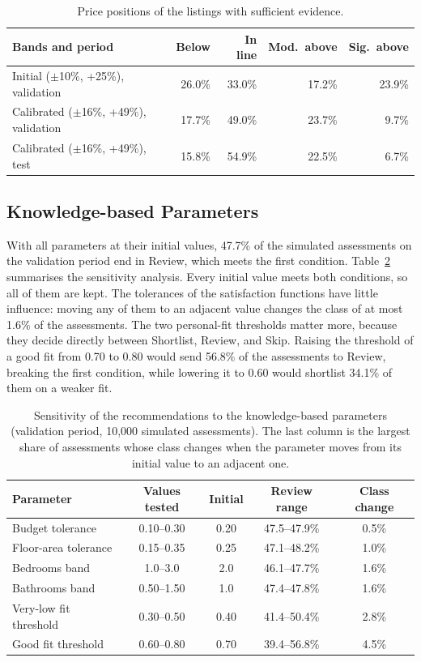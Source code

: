 \documentclass[12pt,a4paper]{report}
\begin{document}
\begin{table}[H]
\centering
\caption{Price positions of the listings with sufficient evidence.}
\label{tab:positions}
\small
\begin{tabularx}{\textwidth}{X r r r r}
\toprule
\textbf{Bands and period} & \textbf{Below} & \textbf{In line} &
\textbf{Mod.\ above} & \textbf{Sig.\ above}\\
\midrule
Initial ($\pm$10\%, +25\%), validation & 26.0\% & 33.0\% & 17.2\% & 23.9\%\\
Calibrated ($\pm$16\%, +49\%), validation & 17.7\% & 49.0\% & 23.7\% & 9.7\%\\
Calibrated ($\pm$16\%, +49\%), test & 15.8\% & 54.9\% & 22.5\% & 6.7\%\\
\bottomrule
\end{tabularx}
\end{table}

\subsection{Knowledge-based Parameters}

With all parameters at their initial values, 47.7\% of the simulated
assessments on the validation period end in Review, which meets the first
condition. Table~\ref{tab:sensitivity} summarises the sensitivity analysis.
Every initial value meets both conditions, so all of them are kept. The
tolerances of the satisfaction functions have little influence: moving any
of them to an adjacent value changes the class of at most 1.6\% of the
assessments. The two personal-fit thresholds matter more, because they
decide directly between Shortlist, Review, and Skip. Raising the threshold
of a good fit from 0.70 to 0.80 would send 56.8\% of the assessments to
Review, breaking the first condition, while lowering it to 0.60 would
shortlist 34.1\% of them on a weaker fit.

\begin{table}[H]
\centering
\caption{Sensitivity of the recommendations to the knowledge-based
parameters (validation period, 10,000 simulated assessments). The last
column is the largest share of assessments whose class changes when the
parameter moves from its initial value to an adjacent one.}
\label{tab:sensitivity}
\small
\begin{tabularx}{\textwidth}{X c c c c}
\toprule
\textbf{Parameter} & \textbf{Values tested} & \textbf{Initial} &
\textbf{Review range} & \textbf{Class change}\\
\midrule
Budget tolerance & 0.10--0.30 & 0.20 & 47.5--47.9\% & 0.5\%\\
Floor-area tolerance & 0.15--0.35 & 0.25 & 47.1--48.2\% & 1.0\%\\
Bedrooms band & 1.0--3.0 & 2.0 & 46.1--47.7\% & 1.6\%\\
Bathrooms band & 0.50--1.50 & 1.0 & 47.4--47.8\% & 1.6\%\\
Very-low fit threshold & 0.30--0.50 & 0.40 & 41.4--50.4\% & 2.8\%\\
Good fit threshold & 0.60--0.80 & 0.70 & 39.4--56.8\% & 4.5\%\\
\bottomrule
\end{tabularx}
\end{table}
\end{document}
